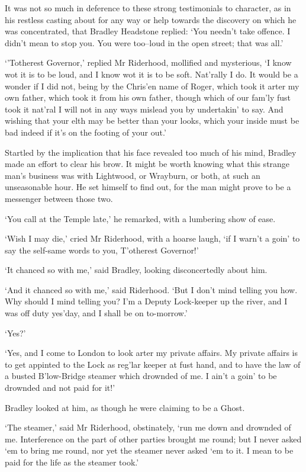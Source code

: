 It was not so much in deference to these strong testimonials to
character, as in his restless casting about for any way or help towards
the discovery on which he was concentrated, that Bradley Headstone
replied: ‘You needn’t take offence. I didn’t mean to stop you. You were
too--loud in the open street; that was all.’

‘’Totherest Governor,’ replied Mr Riderhood, mollified and mysterious,
‘I know wot it is to be loud, and I know wot it is to be soft. Nat’rally
I do. It would be a wonder if I did not, being by the Chris’en name of
Roger, which took it arter my own father, which took it from his own
father, though which of our fam’ly fust took it nat’ral I will not in
any ways mislead you by undertakin’ to say. And wishing that your elth
may be better than your looks, which your inside must be bad indeed if
it’s on the footing of your out.’

Startled by the implication that his face revealed too much of his mind,
Bradley made an effort to clear his brow. It might be worth knowing what
this strange man’s business was with Lightwood, or Wrayburn, or both, at
such an unseasonable hour. He set himself to find out, for the man might
prove to be a messenger between those two.

‘You call at the Temple late,’ he remarked, with a lumbering show of
ease.

‘Wish I may die,’ cried Mr Riderhood, with a hoarse laugh, ‘if I warn’t
a goin’ to say the self-same words to you, T’otherest Governor!’

‘It chanced so with me,’ said Bradley, looking disconcertedly about him.

‘And it chanced so with me,’ said Riderhood. ‘But I don’t mind telling
you how. Why should I mind telling you? I’m a Deputy Lock-keeper up the
river, and I was off duty yes’day, and I shall be on to-morrow.’

‘Yes?’

‘Yes, and I come to London to look arter my private affairs. My private
affairs is to get appinted to the Lock as reg’lar keeper at fust hand,
and to have the law of a busted B’low-Bridge steamer which drownded of
me. I ain’t a goin’ to be drownded and not paid for it!’

Bradley looked at him, as though he were claiming to be a Ghost.

‘The steamer,’ said Mr Riderhood, obstinately, ‘run me down and drownded
of me. Interference on the part of other parties brought me round; but
I never asked ‘em to bring me round, nor yet the steamer never asked ‘em
to it. I mean to be paid for the life as the steamer took.’

